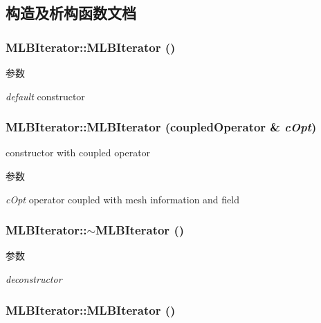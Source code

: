 \subsection{构造及析构函数文档}
\hypertarget{classMLBIterator_a211e06e04c43bf4df46f1d45189fa271}{
\subsubsection[{MLBIterator}]{\setlength{\rightskip}{0pt plus 5cm}MLBIterator::MLBIterator ()}}
\label{classMLBIterator_a211e06e04c43bf4df46f1d45189fa271}

\begin{DoxyParams}{参数}
\item[{\em default}]constructor \end{DoxyParams}
\hypertarget{classMLBIterator_a3ebc135eabdafb635d1b07b7138d5312}{
\subsubsection[{MLBIterator}]{\setlength{\rightskip}{0pt plus 5cm}MLBIterator::MLBIterator (coupledOperator \& {\em cOpt})}}
\label{classMLBIterator_a3ebc135eabdafb635d1b07b7138d5312}


constructor with coupled operator 
\begin{DoxyParams}{参数}
\item[{\em cOpt}]operator coupled with mesh information and field \end{DoxyParams}
\hypertarget{classMLBIterator_adf1f2571a69820fefe660ad605b4378b}{
\subsubsection[{$\sim$MLBIterator}]{\setlength{\rightskip}{0pt plus 5cm}MLBIterator::$\sim$MLBIterator ()}}
\label{classMLBIterator_adf1f2571a69820fefe660ad605b4378b}

\begin{DoxyParams}{参数}
\item[{\em deconstructor}]\end{DoxyParams}
\hypertarget{classMLBIterator_a211e06e04c43bf4df46f1d45189fa271}{
\subsubsection[{MLBIterator}]{\setlength{\rightskip}{0pt plus 5cm}MLBIterator::MLBIterator ()}}
\label{classMLBIterator_a211e06e04c43bf4df46f1d45189fa271}

